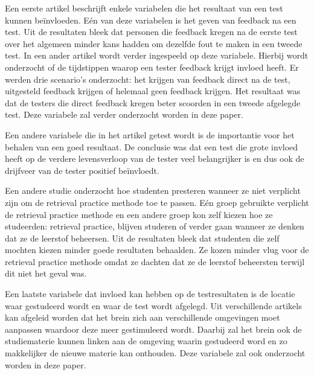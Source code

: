 \documentclass{hogent-article}
\begin{document}
    
    Een eerste artikel \autocite{brame2015test} beschrijft enkele variabelen die het resultaat van een test kunnen beïnvloeden. Eén van deze variabelen is het geven van feedback na een test. Uit de resultaten bleek dat personen die feedback kregen na de eerste test over het algemeen minder kans hadden om dezelfde fout te maken in een tweede test.
    In een ander artikel \autocite{roediger2011critical} wordt verder ingespeeld op deze variabele. Hierbij wordt onderzocht of de tijdstippen waarop een tester feedback krijgt invloed heeft. Er werden drie scenario's onderzocht: het krijgen van feedback direct na de test, uitgesteld feedback krijgen of helemaal geen feedback krijgen. Het resultaat was dat de testers die direct feedback kregen beter scoorden in een tweede afgelegde test. Deze variabele zal verder onderzocht worden in deze paper.
    
    Een andere variabele die in het artikel \autocite{brame2015test} getest wordt is de importantie voor het behalen van een goed resultaat. De conclusie was dat een test die grote invloed heeft op de verdere levensverloop van de tester veel belangrijker is en dus ook de drijfveer van de tester positief beïnvloedt.
    
    Een andere studie \autocite{karpicke2009metacognitive} onderzocht hoe studenten presteren wanneer ze niet verplicht zijn om de retrieval practice methode toe te passen. Eén groep gebruikte verplicht de retrieval practice methode en een andere groep kon zelf kiezen hoe ze studeerden: retrieval practice, blijven studeren of verder gaan wanneer ze denken dat ze de leerstof beheersen. Uit de resultaten bleek dat studenten die zelf mochten kiezen minder goede resultaten behaalden. Ze kozen minder vlug voor de retrieval practice methode omdat ze dachten dat ze de leerstof beheersten terwijl dit niet het geval was. 
    
    
    Een laatste variabele dat invloed kan hebben op de testresultaten is de locatie waar gestudeerd wordt en waar de test wordt afgelegd. Uit verschillende artikels \autocite{smith1978environmental, smith1984contextual} kan afgeleid worden dat het brein zich aan verschillende omgevingen moet aanpassen waardoor deze meer gestimuleerd wordt. Daarbij zal het brein ook de studiematerie kunnen linken aan de omgeving waarin gestudeerd word en zo makkelijker de nieuwe materie kan onthouden. Deze variabele zal ook onderzocht worden in deze paper.
      
\end{document}
